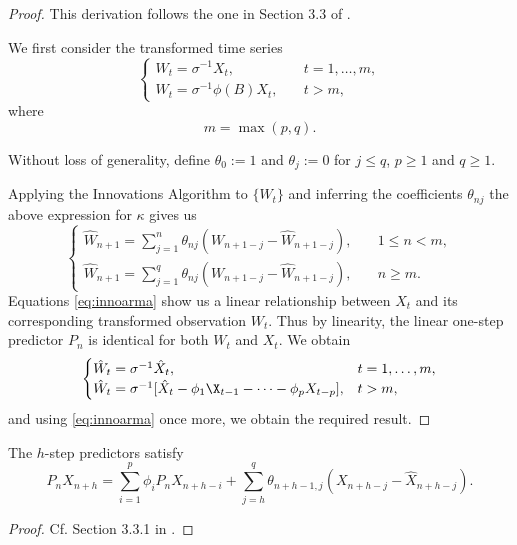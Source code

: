 \documentclass[a4paper, oneside]{discothesis}
\begin{document}
\begin{proof}
This derivation follows the one in Section 3.3 of \cite{itsf}.

We first consider the transformed time series
\begin{equation} \label{eq:innoarma}
    \begin{cases}
    W_t = \sigma^{-1}X_t, \quad &t = 1, \dots, m, \\
    W_t = \sigma^{-1}\phi(B)X_t, \quad &t > m,
    \end{cases}
\end{equation}
where
\begin{equation}
    m = \max(p,q).
\end{equation}

Without loss of generality, define $\theta_0 := 1$ and $\theta_j:=0$ for $j\leq q$, $p \geq 1$ and $q \geq 1$.

Applying the Innovations Algorithm to $\{W_t\}$ and inferring the coefficients $\theta_{nj}$ the above expression for $\kappa$ gives us
\begin{equation*}
    \begin{cases}
        \hat{W}_{n+1} = \sum_{j=1}^n \theta_{nj} (W_{n+1-j} - \hat{W}_{n+1-j}), \quad & 1 \leq n < m, \\
        \hat{W}_{n+1} = \sum_{j=1}^q \theta_{nj} (W_{n+1-j} - \hat{W}_{n+1-j}), \quad & n \geq m.
    \end{cases}
\end{equation*}
Equations \eqref{eq:innoarma} show us a linear relationship between $X_t$ and its corresponding transformed observation $W_t$. Thus by linearity, the linear one-step predictor $P_n$ is identical for both $W_t$ and $X_t$. We obtain
\begin{equation*}
    \begin{cases}
        \hat{W}_t = \sigma^{-1} \hat{X}_t, \quad & t=1, \dots, m, \\
        \hat{W}_t = \sigma^{-1} [\hat{X}_t - \phi_1 \X_{t-1} - \dots - \phi_p X_{t-p}], & t > m,
    \end{cases}
\end{equation*}
and using \eqref{eq:innoarma} once more, we obtain the required result.
\end{proof}

\begin{corollary}
    The $h$-step predictors satisfy
    \begin{equation}\label{eq:hsteppred}
        P_n X_{n+h} = \sum_{i=1}^p \phi_i P_n X_{n+h-i} + \sum_{j=h}^q \theta_{n+h-1,j}(X_{n+h-j} - \hat{X}_{n+h-j}).
    \end{equation}
\end{corollary}
\begin{proof}
    Cf. Section 3.3.1 in \cite{itsf}.
\end{proof}
\end{document}
